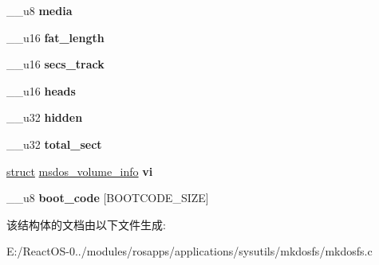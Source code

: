 \begin{DoxyCompactItemize}
\mbox{\label{structmsdos__boot__sector_ae58f108a9cdcf7f611d87adc9fd6a242}} 
\+\_\+\+\_\+u8 {\bfseries media}
\item 
\mbox{\label{structmsdos__boot__sector_a28371db4d3d49e134785a1fa73a4ec54}} 
\+\_\+\+\_\+u16 {\bfseries fat\+\_\+length}
\item 
\mbox{\label{structmsdos__boot__sector_ad59fa63a2c57a3e88e52b106be7145a4}} 
\+\_\+\+\_\+u16 {\bfseries secs\+\_\+track}
\item 
\mbox{\label{structmsdos__boot__sector_a730aa3a4390c63666f878dd0b132ac54}} 
\+\_\+\+\_\+u16 {\bfseries heads}
\item 
\mbox{\label{structmsdos__boot__sector_acf77b92604e4ca02efce475c354b3b57}} 
\+\_\+\+\_\+u32 {\bfseries hidden}
\item 
\mbox{\label{structmsdos__boot__sector_a54b6134b06fb45263b4d751bffec210f}} 
\+\_\+\+\_\+u32 {\bfseries total\+\_\+sect}
\item 
\mbox{\label{structmsdos__boot__sector_a0a4c2a46d16e8c8433f0daf75937bd63}} 
\hyperlink{interfacestruct}{struct} \hyperlink{structmsdos__volume__info}{msdos\+\_\+volume\+\_\+info} {\bfseries vi}
\item 
\mbox{\label{structmsdos__boot__sector_ad2259282bb9bcb54685aa58ed37473a2}} 
\+\_\+\+\_\+u8 {\bfseries boot\+\_\+code} \mbox{[}B\+O\+O\+T\+C\+O\+D\+E\+\_\+\+S\+I\+ZE\mbox{]}
\end{DoxyCompactItemize}


该结构体的文档由以下文件生成\+:\begin{DoxyCompactItemize}
\item 
E\+:/\+React\+O\+S-\/0../modules/rosapps/applications/sysutils/mkdosfs/mkdosfs.\+c\end{DoxyCompactItemize}
